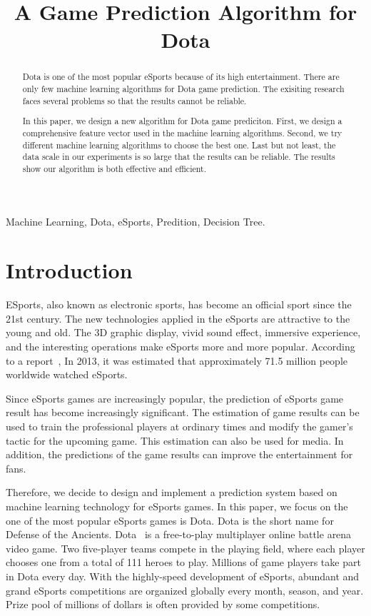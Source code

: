 \documentclass{article}
\title{A Game Prediction Algorithm for Dota}
\begin{document}
%
\maketitle
%
\begin{abstract}
Dota is one of the most popular eSports because of its high entertainment.
There are only few machine learning algorithms for Dota game prediction.
The exisiting research faces several problems so that the results cannot
be reliable.

In this paper, we design a new algorithm for Dota game prediciton.  
First, we design a comprehensive feature vector used in the machine learning algorithms.
Second, we try different machine learning algorithms to choose the best one.
Last but not least, the data scale in our experiments is so large that the results can be reliable.
The results show our algorithm is both effective and efficient.

\end{abstract}
\begin{keywords}
Machine Learning, Dota, eSports, Predition, Decision Tree.
\end{keywords}
%
\section{Introduction}

ESports, also known as electronic sports, has become an official sport since the 21st century.
The new technologies applied in the eSports are attractive to the young and old.
The 3D graphic display, vivid sound effect, immersive experience, and the interesting operations make eSports more and more popular.
According to a report~\cite{esports}, In 2013, it was estimated that approximately 71.5 million people worldwide watched eSports.

Since eSports games are increasingly popular, the prediction of eSports game result has become increasingly significant.
The estimation of game results can be used to train the professional players at ordinary times and modify the gamer’s tactic for the upcoming game.
This estimation can also be used for media.
In addition, the predictions of the game results can improve the entertainment for fans.

Therefore, we decide to design and implement a prediction system based on machine learning technology for eSports games.
In this paper, we focus on the one of the most popular eSports games is Dota.
Dota is the short name for Defense of the Ancients.
Dota~\cite{dotablog} is a free-to-play multiplayer online battle arena video game.
Two five-player teams compete in the playing field, where each player chooses one from a total of 111 heroes to play.
Millions of game players take part in Dota every day.
With the highly-speed development of eSports, abundant and grand eSports competitions are organized globally every month, season, and year.
Prize pool of millions of dollars is often provided by some competitions.
\end{document}
